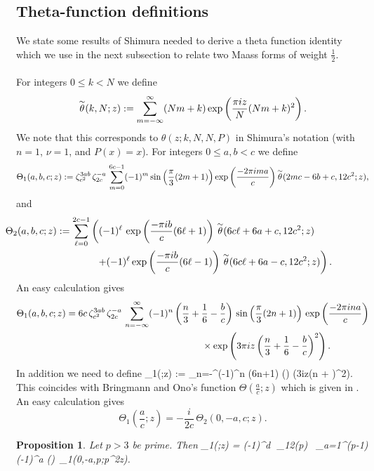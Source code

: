 \documentclass[12pt]{amsart}
\newtheorem{prop}[theorem]{Proposition}
\theoremstyle{definition}
\theoremstyle{remark}
\numberwithin{equation}{section}
\newcommand\Lpar[1]{\left(#1\right)}
\newcommand\THA[3]{\Theta_1\Lpar{\frac{#1}{#2};#3}}
\newcommand\ttwid{\overset {\text{\lower 3pt\hbox{$\sim$}}}\theta}
\begin{document}
\subsection{Theta-function definitions}
We state some results of Shimura \cite{Sh} needed to derive a theta function identity which we use in the next subsection to relate two Maass forms of weight $\frac{1}{2}$.
\\\\
For integers $0\le k < N$ we define
$$
\ttwid(k,N;z) := \sum_{m=-\infty}^\infty (Nm+k) \exp\Lpar{\frac{\pi i z}{N}(Nm+k)^2}.
$$
We note that this corresponds to $\theta(z;k,N,N,P)$ in Shimura's 
notation \cite[Eq.(2.0), p.454]{Sh} (with $n=1$, $\nu=1$, and $P(x)=x$).
For integers $0\le a,b < c$ we define
$$
\Theta_1(a,b,c;z) := \zeta_{c^2}^{3ab}\, \zeta_{2c}^{-a}\,
\sum_{m=0}^{6c-1} (-1)^m \sin\Lpar{\frac{\pi}{3}(2m+1)}
\exp\Lpar{\frac{-2\pi i m a}{c}} \ttwid(2mc-6b+c,12c^2;z),
$$
and
\begin{align*}
\hspace{-17mm}\Theta_2(a,b,c;z) &:= \sum_{\ell=0}^{2c-1} \left( (-1)^\ell \, 
\exp\Lpar{\frac{-\pi ib}{c}(6\ell+1)} \, \ttwid(6c\ell + 6a + c,12c^2;z) \right.\\
&\qquad\qquad \left. + (-1)^\ell
\exp\Lpar{\frac{-\pi ib}{c}(6\ell-1)} \, \ttwid(6c\ell + 6a - c,12c^2;z) \right).
\end{align*}
An easy calculation gives
\begin{align}
\Theta_1(a,b,c;z) &=
6c\,\zeta_{c^2}^{3ab}\, \zeta_{2c}^{-a}\,
\sum_{n=-\infty}^\infty (-1)^n \Lpar{\frac{n}{3} + \frac{1}{6} - \frac{b}{c}}\,
\sin\Lpar{\frac{\pi}{3}(2n+1)}\,
\exp\Lpar{\frac{-2\pi i n a}{c}} 
\label{eq:Theta1abcid}\\
&\hskip 2in \times \exp\Lpar{3\pi i z\Lpar{\frac{n}{3} + \frac{1}{6} - \frac{b}{c}}^2}.
\nonumber
\end{align}
In addition we need to define
\beq
\THA{a}{c}{z} := \sum_{n=-\infty}^\infty (-1)^n (6n+1) \sin\Lpar{}
\exp\Lpar{3\pi iz\Lpar{n + }^2}. 
\label{eq:Theta1acdef}
\eeq
This coincides with Bringmann and Ono's
function $\Theta\Lpar{\frac{a}{c};z}$ which is given in \cite[Eq.(1.6), p.423]{Br-On10}.
An easy calculation gives
$$
\THA{a}{c}{z}  = -\frac{i}{2c} \, \Theta_2(0,-a,c;z).
$$
\begin{prop}
\label{propo:theta1id}
Let $p > 3$ be prime. Then 
\beq
\THA{d}{p}{z}
=
(-1)^d\,  \,\chi_{12}(p) \,
\sum_{a=1}^{(p-1)} (-1)^a 
\sin\Lpar{} \,\Theta_1(0,-a,p;p^2z).
\label{eq:theta1id}
\eeq
\end{prop}
\end{document}
